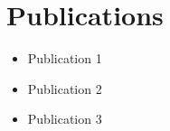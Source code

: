 \chapter*{Publications}
\begin{itemize}
    \item Publication 1
    \item Publication 2
    \item Publication 3
\end{itemize}
\cleardoublepage